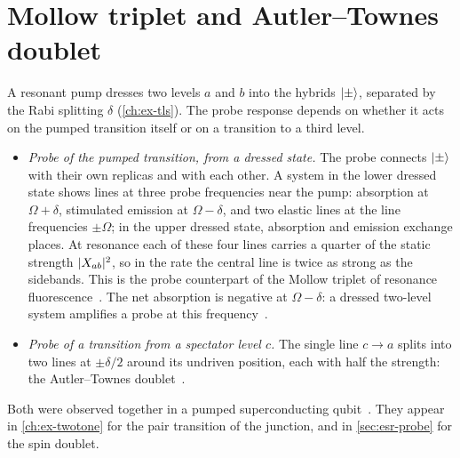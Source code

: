 \section{Mollow triplet and Autler--Townes doublet}\label{sec:mollow}

A resonant pump dresses two levels $a$ and $b$ into the hybrids $\lvert \pm\rangle$, separated by
the Rabi splitting $\delta$ (\cref{ch:ex-tls}). The probe response depends on whether it acts
on the pumped transition itself or on a transition to a third level.
\begin{itemize}
\item \emph{Probe of the pumped transition, from a dressed state.} The probe connects
$\lvert \pm\rangle$ with their own replicas and with each other. A system in the lower dressed state
shows lines at three probe frequencies near the pump: absorption at $\Omega+\delta$,
stimulated emission at $\Omega-\delta$, and two elastic lines at the line frequencies
$\pm\Omega$; in the upper dressed state, absorption and emission exchange places. At
resonance each of these four lines carries a quarter of the static strength
$\lvert X_{ab}\rvert^2$, so in the rate the central line is twice as strong as the sidebands. This
is the probe counterpart of the Mollow triplet of resonance
fluorescence~\cite{mollow1969power,mollow1972stimulated,cohentannoudji1998atom}.
The net absorption is negative at $\Omega-\delta$: a dressed two-level system amplifies a
probe at this frequency~\cite{wu1977observation}.
\item \emph{Probe of a transition from a spectator level $c$.} The single line $c\to a$
splits into two lines at $\pm\delta/2$ around its undriven position, each with half the
strength: the Autler--Townes doublet~\cite{autler1955stark}.
\end{itemize}
Both were observed together in a pumped superconducting qubit~\cite{baur2009measurement}.
They appear in \cref{ch:ex-twotone} for the pair transition of the junction, and in
\cref{sec:esr-probe} for the spin doublet.
